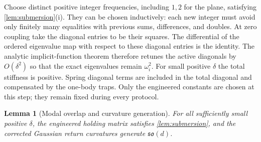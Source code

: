 \documentclass[11pt]{article}
\numberwithin{equation}{section}
\newtheorem{lemma}[lemma]{Lemma}
\theoremstyle{definition}
\begin{document}
Choose distinct positive integer frequencies, including $1,2$
for the plane, satisfying \cref{lem:submersion}(i).
They can be chosen inductively: each new integer must avoid only
finitely many equalities with previous sums, differences, and doubles.
At zero coupling take the diagonal entries to be their squares.
The differential of the ordered eigenvalue map with respect to
these diagonal entries is the identity. The analytic implicit-function
theorem therefore retunes the active diagonals by $O(\delta^2)$
so that the exact eigenvalues remain $\omega_i^2$.
For small positive $\delta$ the total stiffness is positive.
Spring diagonal terms are included in the total diagonal and
compensated by the one-body traps. Only the engineered constants
are chosen at this step; they remain fixed during every protocol.

\begin{lemma}[Modal overlap and curvature generation]\label{lem:engineer}
For all sufficiently small positive $\delta$, the engineered
holding matrix satisfies \cref{lem:submersion}, and the corrected
Gaussian return curvatures generate $\mathfrak{so}(d)$.
\end{lemma}
\end{document}
